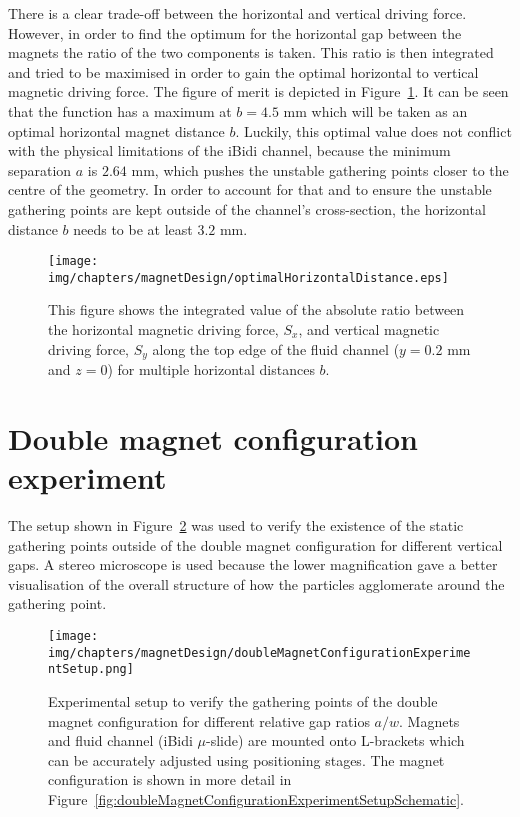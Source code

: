 There is a clear trade-off between the horizontal and vertical driving force. However, in order to find the optimum for the horizontal gap between the magnets the ratio of the two components is taken. This ratio is then integrated and tried to be maximised in order to gain the optimal horizontal to vertical magnetic driving force. The figure of merit is depicted in Figure~\ref{fig:optimalHorizontalDistance}. It can be seen that the function has a maximum at $b=4.5$ mm which will be taken as an optimal horizontal magnet distance $b$. Luckily, this optimal value does not conflict with the physical limitations of the iBidi channel, because the minimum separation $a$ is $2.64$ mm, which pushes the unstable gathering points closer to the centre of the geometry. In order to account for that and to ensure the unstable gathering points are kept outside of the channel's cross-section, the horizontal distance $b$ needs to be at least $3.2$ mm.  

\begin{figure}[!htb]%
\centering
	\texttt{[image: img/chapters/magnetDesign/optimalHorizontalDistance.eps]}
\caption[Accumulated magnetophoretic driving force ratio for different horizontal distances]{This figure shows the integrated value of the absolute ratio between the horizontal magnetic driving force, $S_{x}$, and vertical magnetic driving force, $S_{y}$ along the top edge of the fluid channel ($y=0.2$ mm and $z=0$) for multiple horizontal distances $b$.}
\label{fig:optimalHorizontalDistance}
\end{figure}

\section{Double magnet configuration experiment}\label{sec:doubleMagnetConfigurationExperiment}
The setup shown in Figure~\ref{fig:doubleMagnetConfigurationExperimentSetup} was used to verify the existence of the static gathering points outside of the double magnet configuration for different vertical gaps. A stereo microscope is used because the lower magnification gave a better visualisation of the overall structure of how the particles agglomerate around the gathering point. 

\begin{figure}[htb]%
\centering
	\texttt{[image: img/chapters/magnetDesign/doubleMagnetConfigurationExperimentSetup.png]}
\caption[Experimental setup to verify static gathering points]{Experimental setup to verify the gathering points of the double magnet configuration for different relative gap ratios $a/w$. Magnets and fluid channel (iBidi $\mu$-slide) are mounted onto L-brackets which can be accurately adjusted using positioning stages. The magnet configuration is shown in more detail in Figure~\ref{fig:doubleMagnetConfigurationExperimentSetupSchematic}.}
\label{fig:doubleMagnetConfigurationExperimentSetup}
\end{figure}

